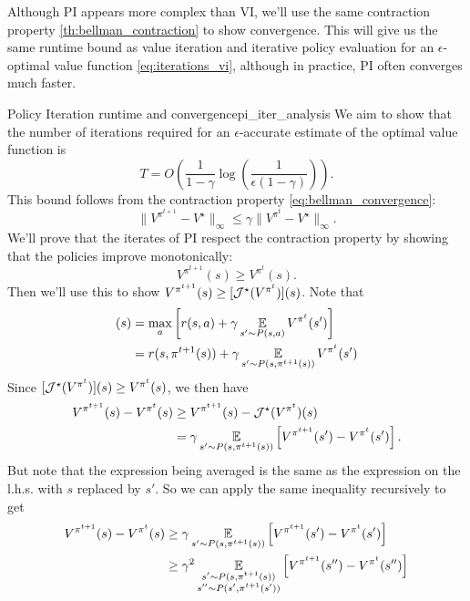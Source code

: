 \documentclass[\main/main]{subfiles}
\begin{document}
Although PI appears more complex than VI, we'll use the same contraction property \eqref{th:bellman_contraction} to show convergence. This will give us the same runtime bound as value iteration and iterative policy evaluation for an $\epsilon$-optimal value function \eqref{eq:iterations_vi}, although in practice, PI often converges much faster.

\begin{theorem}{Policy Iteration runtime and convergence}{pi_iter_analysis}
We aim to show that the number of iterations required for an $\epsilon$-accurate estimate of the optimal value function is
\[
    T = O\left( \frac{1}{1-\gamma} \log\left(\frac{1}{\epsilon (1-\gamma)}\right) \right).
\]
This bound follows from the contraction property \eqref{eq:bellman_convergence}:
\[
    \|V^{\pi^{t+1}} - V^\star \|_{\infty} \le \gamma \|V^{\pi^{t}} - V^\star \|_{\infty}.
\]
We'll prove that the iterates of PI respect the contraction property by showing that the policies improve monotonically:
\[
    V^{\pi^{t+1}}(s) \ge V^{\pi^{t}}(s).
\]
Then we'll use this to show $V^{\pi^{t+1}}(s) \ge [\mathcal{J}^{\star}(V^{\pi^{t}})](s)$. Note that
\begin{align*}
    [\bop^{\star} (V^{\pi^{t}})](s) &= \max_a \left[ r(s, a) + \gamma \E_{s' \sim P(s, a)} V^{\pi^{t}}(s') \right] \\
    &= r(s, \pi^{t+1}(s)) + \gamma \E_{s' \sim P(s, \pi^{t+1}(s))} V^{\pi^{t}}(s')
\end{align*}
Since $[\mathcal{J}^{\star}(V^{\pi^{t}})](s) \ge V^{\pi^{t}}(s)$, we then have
\begin{equation}
    \begin{aligned}
        V^{\pi^{t+1}}(s) - V^{\pi^{t}}(s) &\ge V^{\pi^{t+1}}(s) - \mathcal{J}^{\star} (V^{\pi^{t}})(s) \\
        &= \gamma \operatorname*{\mathbb{E}}_{s' \sim P(s, \pi^{t+1}(s))} \left[V^{\pi^{t+1}}(s') -  V^{\pi^{t}}(s') \right].
    \end{aligned} \label{eq:pi_iter_proof}
\end{equation}
But note that the expression being averaged is the same as the expression on the l.h.s. with $s$ replaced by $s'$. So we can apply the same inequality recursively to get
\begin{align*}
    V^{\pi^{t+1}}(s) - V^{\pi^{t}}(s) &\ge  \gamma \E_{s' \sim P(s, \pi^{t+1}(s))} \left[V^{\pi^{t+1}}(s') -  V^{\pi^{t}}(s') \right] \\
    &\ge \gamma^2 \E_{\substack{s' \sim P(s, \pi^{t+1}(s)) \\ s'' \sim P(s', \pi^{t+1}(s'))}} \left[V^{\pi^{t+1}}(s'') -  V^{\pi^{t}}(s'') \right]\\

\end{align*}
\end{theorem}
\end{document}
